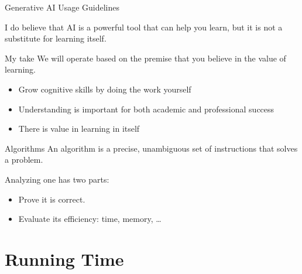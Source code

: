 \documentclass[10pt,aspectratio=169]{beamer}
\begin{document}
\begin{frame}{Generative AI Usage Guidelines}

  I do believe that AI is a powerful tool that can help you learn, but it is not a substitute for learning itself.

  \begin{alertblock}{My take} We will operate based on the premise that you believe in the value of learning. 
  \end{alertblock}

  \begin{itemize}
    \item Grow cognitive skills by doing the work yourself
    \item Understanding is important for both academic and professional success
    \item There is value in learning in itself
  \end{itemize}

\end{frame}

\begin{frame}{Algorithms}
  An algorithm is a \alert{precise, unambiguous} set of instructions that solves a problem.

  \bigskip
  Analyzing one has two parts:

  \pause
  \begin{itemize}
    \item Prove it is \alert{correct}.
    \item Evaluate its \alert{efficiency}: time, memory, \ldots
  \end{itemize}


\end{frame}

\section{Running Time}
\end{document}
